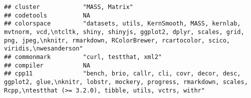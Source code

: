 \documentclass[
]{article}
\begin{document}
\begin{verbatim}
## cluster            "MASS, Matrix"                                                                                                                                                                                                                                                                                                                                                                                                                                                                    
## codetools          NA                                                                                                                                                                                                                                                                                                                                                                                                                                                                                
## colorspace         "datasets, utils, KernSmooth, MASS, kernlab, mvtnorm, vcd,\ntcltk, shiny, shinyjs, ggplot2, dplyr, scales, grid, png, jpeg,\nknitr, rmarkdown, RColorBrewer, rcartocolor, scico, viridis,\nwesanderson"                                                                                                                                                                                                                                                                           
## commonmark         "curl, testthat, xml2"                                                                                                                                                                                                                                                                                                                                                                                                                                                            
## compiler           NA                                                                                                                                                                                                                                                                                                                                                                                                                                                                                
## cpp11              "bench, brio, callr, cli, covr, decor, desc, ggplot2, glue,\nknitr, lobstr, mockery, progress, rmarkdown, scales, Rcpp,\ntestthat (>= 3.2.0), tibble, utils, vctrs, withr"                                                                                                                                                                                                                                                                                                        

\end{verbatim}
\end{document}
